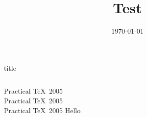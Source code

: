 \documentclass[12pt]{beamer}
\title{Test}
\date{\today}
\author{}
\begin{document}
\begin{frame}

    \vspace*{1cm}

    \begin{beamercolorbox}[colsep=-4bp,rounded=false,shadow=false,ht=0.5cm,dp=0.5cm,center]{title}
          \inserttitle
    \end{beamercolorbox}

    \vspace*{0.5cm}

    \begin{columns}[c]
        \column{1.5in}
            Practical \TeX\ 2005\\
            Practical \TeX\ 2005\\
            Practical \TeX\ 2005
        \column{1.5in}
            Hello
    \end{columns}

    \vspace*{0.5cm}

    \begin{center}
        \insertdate
    \end{center}

\end{frame}
\end{document}
